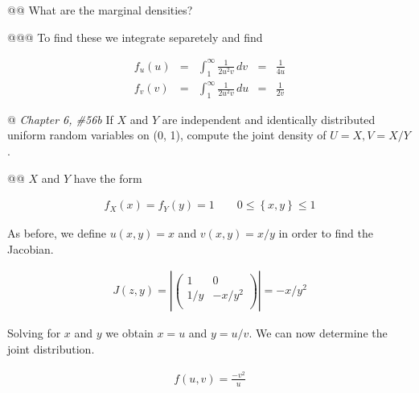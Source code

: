 \documentclass[11pt]{article}\usepackage[]{graphicx}\usepackage[]{xcolor}
\begin{document}
\begin{easylist}[enumerate]
    @@ What are the marginal densities?

    @@@ To find these we integrate separetely and find

    \begin{equation}
        \begin{aligned}
            f_u(u) &=& \int^\infty_1
                \frac{1}{2u^2v}
                \, dv &=& \frac{1}{4u}\\
            f_v(v) &=& \int^\infty_1
                \frac{1}{2u^2v}
                \, du &=& \frac{1}{2v}
        \end{aligned}
    \end{equation}

    @ \textit{Chapter 6, \#56b} If $X$ and $Y$ are independent and identically distributed uniform random variables on
    (0, 1), compute the joint density of $U = X, V = X/Y$.

    @@ $X$ and $Y$ have the form

    \begin{equation}
        \begin{aligned}
            f_X(x) = f_Y(y) = 1 \qquad 0 \le \left\{ x,y \right\} \le 1
        \end{aligned}
    \end{equation}

    As before, we define $u(x,y)=x$ and $v(x,y)=x/y$ in order to find the Jacobian.

    \begin{equation}
        \begin{aligned}
            J(z,y) = \left| \begin{pmatrix}
                                1 & 0\\
                                1/y & -x/y^2\\
                            \end{pmatrix}
                          \right| = -x/y^2
        \end{aligned}
    \end{equation}

    Solving for $x$ and $y$ we obtain $x=u$ and $y=u/v$. We can now determine the joint distribution.

    \begin{equation}
        \begin{aligned}
            f(u, v) = \frac{-v^2}{u}
        \end{aligned}
    \end{equation}


\end{easylist}
\end{document}
